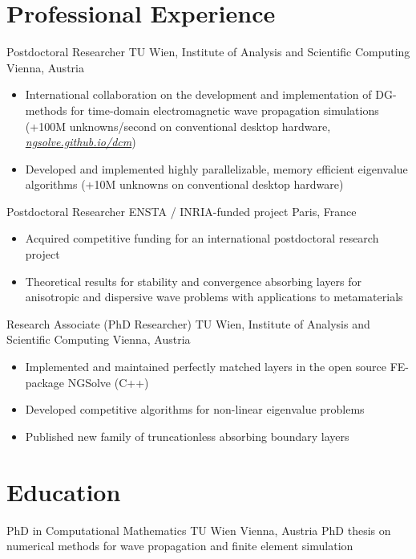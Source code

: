 \documentclass[11pt,a4paper]{moderncv}
\begin{document}
\section{Professional Experience}

{Postdoctoral Researcher}
{TU Wien, Institute of Analysis and Scientific Computing}
{Vienna, Austria}
{}
{
\begin{itemize}
  \item International collaboration on the development and implementation of DG-methods for time-domain electromagnetic wave propagation simulations (+100M unknowns/second on conventional desktop hardware, \hspace{100pt}\href{https://ngsolve.github.io/dcm}{\emph{ngsolve.github.io/dcm}})
  \item Developed and implemented highly parallelizable, memory efficient eigenvalue algorithms (+10M unknowns on conventional desktop hardware)
\end{itemize}
}

{Postdoctoral Researcher}
{ENSTA / INRIA-funded project}
{Paris, France}
{}
{
\begin{itemize}
\item Acquired competitive funding for an international postdoctoral research project
\item Theoretical results for stability and convergence absorbing layers for anisotropic and dispersive wave problems with applications to metamaterials
\end{itemize}
}

{Research Associate (PhD Researcher)}
{TU Wien, Institute of Analysis and Scientific Computing}
{Vienna, Austria}
{}
{
\begin{itemize}
  \item Implemented and maintained perfectly matched layers in the open source FE-package NGSolve (C++)
  \item Developed competitive algorithms for non-linear eigenvalue problems
  \item Published new family of truncationless absorbing boundary layers
\end{itemize}
}


\newpage


\section{Education}

{PhD in Computational Mathematics}
{TU Wien}
{Vienna, Austria}
{}
{PhD thesis on numerical methods for wave propagation and finite element simulation}
\end{document}
